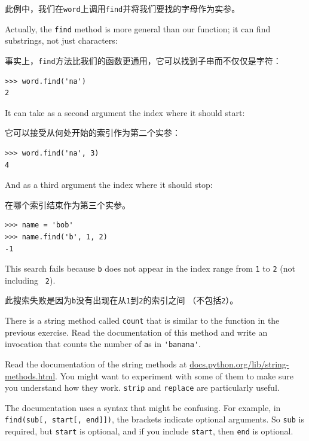 \documentclass[10pt]{book}
\begin{document}
\begin{CJK}{UTF8}{gbsn}
此例中，我们在{\tt word}上调用{\tt find}并将我们要找的字母作为实参。

Actually, the {\tt find} method is more general than our function;
it can find substrings, not just characters:

事实上，{\tt find}方法比我们的函数更通用，它可以找到子串而不仅仅是字符：

\begin{verbatim}
>>> word.find('na')
2
\end{verbatim}
%
It can take as a second argument the index where it should start:

它可以接受从何处开始的索引作为第二个实参：

\begin{verbatim}
>>> word.find('na', 3)
4
\end{verbatim}
%
And as a third argument the index where it should stop:

在哪个索引结束作为第三个实参。

\begin{verbatim}
>>> name = 'bob'
>>> name.find('b', 1, 2)
-1
\end{verbatim}
%
This search fails because {\tt b} does not
appear in the index range from {\tt 1} to {\tt 2} (not including {\tt
2}).

此搜索失败是因为{\tt b}没有出现在从{\tt 1}到{\tt 2}的索引之间
（不包括{\tt 2}）。


\begin{exercise}

There is a string method called {\tt count} that is similar
to the function in the previous exercise.  Read the documentation
of this method
and write an invocation that counts the number of {\tt a}s
in \verb"'banana'".
\end{exercise}


\begin{exercise}

Read the documentation of the string methods at
\url{docs.python.org/lib/string-methods.html}.  You
might want to experiment with some of them to make sure
you understand how they work.  {\tt strip} and
{\tt replace} are particularly useful.

The documentation uses a syntax that might be confusing.
For example, in \verb"find(sub[, start[, end]])", the brackets
indicate optional arguments.  So {\tt sub} is required, but
{\tt start} is optional, and if you include {\tt start},
then {\tt end} is optional.
\end{exercise}



\end{CJK}
\end{document}
